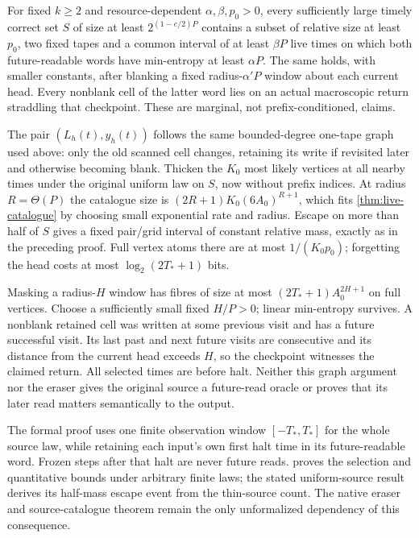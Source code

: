 \begin{corollary}\label{cor:remote-information}
For fixed $k\ge2$ and resource-dependent $\alpha,\beta,p_0>0$, every sufficiently large timely
correct set $S$ of size at least $2^{(1-e/2)P}$ contains a subset of relative
size at least $p_0$, two fixed tapes and a common interval of at least
$\beta P$ live times on which both future-readable words have min-entropy
at least $\alpha P$. The same holds, with smaller constants, after blanking
a fixed radius-$\alpha'P$ window about each current head. Every nonblank
cell of the latter word lies on an actual macroscopic return straddling
that checkpoint. These are marginal, not prefix-conditioned, claims.
\end{corollary}
\begin{informalproof}
The pair $(L_h(t),y_h(t))$ follows the same bounded-degree one-tape graph used
above: only the old scanned cell changes, retaining its write if revisited
later and otherwise becoming blank. Thicken the $K_0$ most likely vertices
at all nearby times under the original uniform law on $S$, now without prefix
indices. At radius $R=\Theta(P)$ the catalogue size is
$(2R+1)K_0(6A_0)^{R+1}$, which fits \cref{thm:live-catalogue} by choosing
small exponential rate and radius. Escape on more than half of $S$ gives a
fixed pair/grid interval of constant relative mass, exactly as in the preceding
proof. Full vertex atoms there are at most $1/(K_0p_0)$; forgetting the head
costs at most $\log_2(2T_*+1)$ bits.

Masking a radius-$H$ window has fibres of size at most
$(2T_*+1)A_0^{2H+1}$ on full vertices. Choose a sufficiently small fixed
$H/P>0$; linear min-entropy survives. A nonblank retained cell was written
at some previous visit and has a future successful visit. Its last past and
next future visits are consecutive and its distance from the current head
exceeds $H$, so the checkpoint witnesses the claimed return. All selected
times are before halt. Neither this graph argument nor the eraser gives the
original source a future-read oracle or proves that its later read matters
semantically to the output.

The formal proof uses one finite observation window $[-T_*,T_*]$ for the
whole source law, while retaining each input's own first halt time in its
future-readable word. Frozen steps after that halt are never future reads.
 proves the
selection and quantitative bounds under arbitrary finite laws; the stated
uniform-source result derives its half-mass escape event from the thin-source
count. The native eraser and source-catalogue theorem remain the only
unformalized dependency of this consequence.
\end{informalproof}
